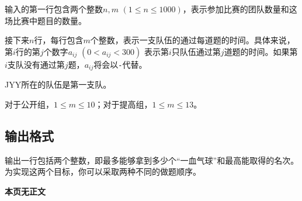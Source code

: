 输入的第一行包含两个整数$n, m$ $(1 \leq n \leq 1000)$，表示参加比赛的团队数量和这场比赛中题目的数量。

接下来$n$行，每行包含$m$个整数，表示一支队伍的通过每道题的时间。具体来说，第$i$行的第$j$个数字$a_{ij}$ $(0 < a_{ij} < 300)$ 表示第$i$只队伍通过第$j$道题的时间。如果第$i$支队没有通过第$j$题，$a_{ij}$将会以\texttt{-}代替。

JYY所在的队伍是第一支队。

对于公开组，$1 \leq m \leq 10$；对于提高组，$1 \leq m \leq 13$。

\subsection*{输出格式}

输出一行包括两个整数，即最多能够拿到多少个“一血气球”和最高能取得的名次。为实现这两个目标，你可以采取两种不同的做题顺序。

\ifodd\value{page}
\clearpage
\else
\fi

\setcounter{ExampleNo}{0}


\clearpage

\ifodd\value{page}
\else
    \vspace*{\fill}
    \begin{center}
    \textbf{\Large 本页无正文}
    \end{center}
    \vspace*{\fill}
    \clearpage
\fi

